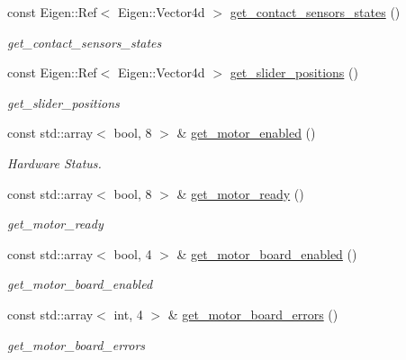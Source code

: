 \begin{DoxyCompactItemize}
const Eigen\+::\+Ref$<$ Eigen\+::\+Vector4d $>$ \hyperlink{classblmc__robots_1_1Solo8TI_aef169a78898e5ee8aaadc63942c3b7b6}{get\+\_\+contact\+\_\+sensors\+\_\+states} ()
\begin{DoxyCompactList}\small\item\em get\+\_\+contact\+\_\+sensors\+\_\+states \end{DoxyCompactList}\item 
const Eigen\+::\+Ref$<$ Eigen\+::\+Vector4d $>$ \hyperlink{classblmc__robots_1_1Solo8TI_ac02884b8402b774ce51c30be6fb4eda6}{get\+\_\+slider\+\_\+positions} ()
\begin{DoxyCompactList}\small\item\em get\+\_\+slider\+\_\+positions \end{DoxyCompactList}\item 
const std\+::array$<$ bool, 8 $>$ \& \hyperlink{classblmc__robots_1_1Solo8TI_acd7e33f11be0d4e63030d1ec4815eba5}{get\+\_\+motor\+\_\+enabled} ()
\begin{DoxyCompactList}\small\item\em Hardware Status. \end{DoxyCompactList}\item 
const std\+::array$<$ bool, 8 $>$ \& \hyperlink{classblmc__robots_1_1Solo8TI_ae0572a7d9b2ec2b4c63188d0957c5b6f}{get\+\_\+motor\+\_\+ready} ()
\begin{DoxyCompactList}\small\item\em get\+\_\+motor\+\_\+ready \end{DoxyCompactList}\item 
const std\+::array$<$ bool, 4 $>$ \& \hyperlink{classblmc__robots_1_1Solo8TI_a1c99bf64212b2b5c84f7ccfbdea5b935}{get\+\_\+motor\+\_\+board\+\_\+enabled} ()
\begin{DoxyCompactList}\small\item\em get\+\_\+motor\+\_\+board\+\_\+enabled \end{DoxyCompactList}\item 
const std\+::array$<$ int, 4 $>$ \& \hyperlink{classblmc__robots_1_1Solo8TI_aa7d82d290e330c86af2f21d16098c460}{get\+\_\+motor\+\_\+board\+\_\+errors} ()
\begin{DoxyCompactList}\small\item\em get\+\_\+motor\+\_\+board\+\_\+errors \end{DoxyCompactList}\end{DoxyCompactItemize}
